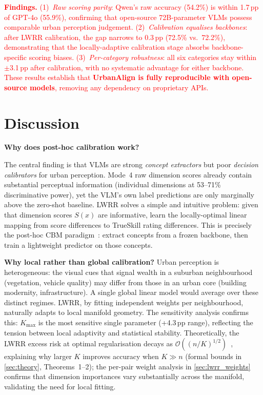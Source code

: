 \documentclass[runningheads]{llncs}
\begin{document}
\textcolor{red}{%
\noindent\textbf{Findings.}
(1)~\emph{Raw scoring parity}: Qwen's raw accuracy (54.2\%) is within 1.7\,pp of GPT-4o (55.9\%), confirming that open-source 72B-parameter VLMs possess comparable urban perception judgement.
(2)~\emph{Calibration equalises backbones}: after LWRR calibration, the gap narrows to 0.3\,pp (72.5\% vs.\ 72.2\%), demonstrating that the locally-adaptive calibration stage absorbs backbone-specific scoring biases.
(3)~\emph{Per-category robustness}: all six categories stay within $\pm$3.1\,pp after calibration, with no systematic advantage for either backbone.
These results establish that \textbf{UrbanAlign is fully reproducible with open-source models}, removing any dependency on proprietary APIs.
}


\section{Discussion}
\label{sec:discussion}

\noindent\textbf{Why does post-hoc calibration work?}

The central finding is that VLMs are strong \emph{concept extractors} but poor \emph{decision calibrators} for urban perception.
Mode~4 raw dimension scores already contain substantial perceptual information (individual dimensions at 53--71\% discriminative power), yet the VLM's own label predictions are only marginally above the zero-shot baseline.
LWRR solves a simple and intuitive problem: given that dimension scores $S(x)$ are informative, learn the locally-optimal linear mapping from score differences to TrueSkill rating differences.
This is precisely the post-hoc CBM paradigm~\cite{yuksekgonul2023posthoc}: extract concepts from a frozen backbone, then train a lightweight predictor on those concepts.

\smallskip\noindent\textbf{Why local rather than global calibration?}
Urban perception is heterogeneous: the visual cues that signal wealth in a suburban neighbourhood (vegetation, vehicle quality) may differ from those in an urban core (building modernity, infrastructure).
A single global linear model would average over these distinct regimes.
LWRR, by fitting independent weights per neighbourhood, naturally adapts to local manifold geometry.
The sensitivity analysis confirms this: $K_{\max}$ is the most sensitive single parameter (+4.3\,pp range), reflecting the tension between local adaptivity and statistical stability.
Theoretically, the LWRR excess risk at optimal regularisation decays as $\mathcal{O}((n/K)^{1/2})$~\cite{caponnetto2007optimal}, explaining why larger $K$ improves accuracy when $K \gg n$ (formal bounds in \cref{sec:theory}, Theorems~1--2); the per-pair weight analysis in \cref{sec:lwrr_weights} confirms that dimension importances vary substantially across the manifold, validating the need for local fitting.
\end{document}
